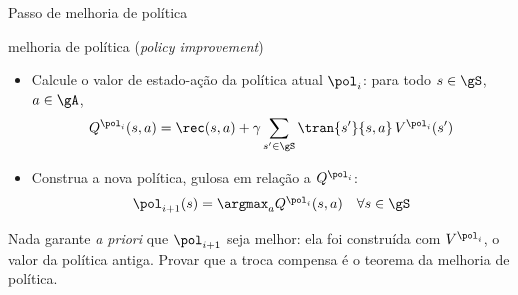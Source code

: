 \documentclass[aspectratio=169, 11pt]{beamer}
\begin{document}
\begin{frame}{Passo de melhoria de política}
  \begin{algbox}{melhoria de política (\emph{policy improvement})}
    \begin{itemize}\setlength{\itemsep}{0.3ex}
      \item Calcule o valor de estado-ação da política atual $\pol_i$: para todo
            $s \in \gS$, $a \in \gA$,
        \[
          Q^{\pol_i}(s,a) = \rec(s,a) + \gamma \sum_{s' \in \gS} \tran{s'}{s,a}\, V^{\pol_i}(s')
        \]
      \item Construa a nova política, gulosa em relação a $Q^{\pol_i}$:
        \[ \textstyle \pol_{i+1}(s) = \argmax_{a} Q^{\pol_i}(s,a) \quad \forall s \in \gS \]
    \end{itemize}
  \end{algbox}
  \begin{ideiabox}
    Nada garante \emph{a priori} que $\pol_{i+1}$ seja melhor: ela foi construída com
    $V^{\pol_i}$, o valor da política \alert{antiga}. Provar que a troca compensa é o
    teorema da melhoria de política.
  \end{ideiabox}
\end{frame}
\end{document}
